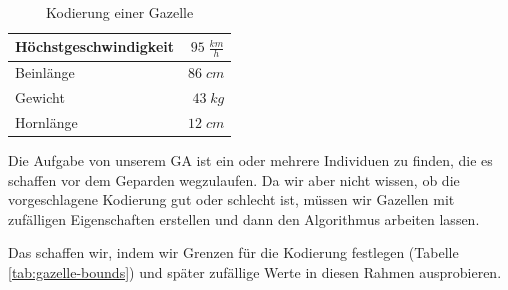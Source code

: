             \begin{multicols}{2}
                \hfill \\[-10mm]
                \begin{table}[H]
                    \begin{center}
                    \begin{tabular}{ |l|r| } 
                        \hline
                        Höchstgeschwindigkeit    & $ 95\; \frac{km}{h}$   \\ \hline
                        Beinlänge                & $ 86\; cm          $   \\ \hline
                        Gewicht                  & $ 43\; kg          $   \\ \hline
                        Hornlänge                & $ 12\; cm          $   \\ \hline
                    \end{tabular}
                    \end{center}
                    \caption{Kodierung einer Gazelle \label{tab:gaz-encoding}}
                \end{table}

                \noindent
                Die Aufgabe von unserem GA ist ein oder mehrere Individuen zu finden, die es schaffen vor dem Geparden wegzulaufen. Da wir aber nicht wissen, ob die vorgeschlagene Kodierung gut oder schlecht ist, müssen wir Gazellen mit zufälligen Eigenschaften erstellen und dann den Algorithmus arbeiten lassen.
            \end{multicols}
            \noindent
            Das schaffen wir, indem wir Grenzen für die Kodierung festlegen (Tabelle \ref{tab:gazelle-bounds}) und später zufällige Werte in diesen Rahmen ausprobieren.


